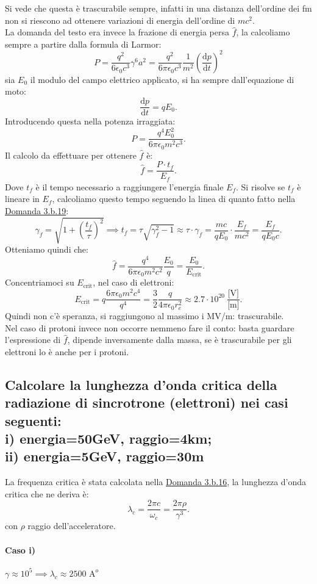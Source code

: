 Si vede che questa è trascurabile sempre, infatti in una distanza dell'ordine dei fm non si riescono ad ottenere variazioni di energia dell'ordine di  $mc^2$.\\
La domanda del testo era invece la frazione di energia persa $\hat{f}$, la calcoliamo sempre a partire dalla formula di Larmor:
\[
	P= \frac{q^2}{6\epsilon_0c^3}\gamma^6 a^2= 
	 \frac{q^2}{6\pi\epsilon_0c^3}\frac{1}{m^2}\left( \frac{\mbox{d} p}{\mbox{d} t}  \right)^2 
\]
sia $E_0$ il modulo del campo elettrico applicato,  si ha sempre dall'equazione di moto:
\[
	\frac{\mbox{d} p}{\mbox{d} t} = qE_0
.\] 
Introducendo questa nella potenza irraggiata:
\[
	P= \frac{q^4E^2_0}{6\pi\epsilon_0m^2c^3}
.\] 
Il calcolo da effettuare per ottenere $\hat{f}$ è:
\[
	\hat{f}= \frac{P\cdot t_f}{E_f}
.\] 
Dove $t_f$ è il tempo necessario a raggiungere l'energia finale $E_f$. Si risolve se $t_f$ è lineare in $E_f $, calcoliamo questo tempo seguendo la linea di quanto fatto nella \hyperref[sec:3.b.19]{Domanda 3.b.19}:
\[
	\gamma_f=\sqrt{1+\left( \frac{t_f}{\tau} \right)^2 } \implies t_f =
	\tau\sqrt{\gamma^2_f-1} \approx \tau \cdot \gamma_f = \frac{mc}{qE_0}\cdot \frac{E_f}{mc^2}= \frac{E_f}{qE_0 c}
.\] 
Otteniamo quindi che:
\[
	\hat{f} = \frac{q^4}{6\pi \epsilon_0m^2c^2}\frac{E_0}{q}=\frac{E_0}{E_{\text{crit}}}
.\] 
Concentriamoci su $E_{\text{crit}}$, nel caso di elettroni:
\[
	E_{\text{crit}}=q \frac{6\pi\epsilon_0m^2c^4}{q^4}= \frac{3}{2}\frac{q}{4\pi\epsilon_0 r_e^2} \approx 2.7 \cdot 10^{20} \ \frac{\text{[V]}}{\text{[m]}}
.\] 
Quindi non c'è speranza, si raggiungono al massimo i MV/m: trascurabile.\\
Nel caso di protoni invece non occorre nemmeno fare il conto: basta guardare l'espressione di $\hat{f}$, dipende inversamente dalla massa, se è trascurabile per gli elettroni lo è anche per i protoni.


\subsection[]{Calcolare la lunghezza d’onda critica della radiazione di sincrotrone (elettroni) nei casi seguenti: \\
i) energia=50GeV, raggio=4km; \\
ii) energia=5GeV, raggio=30m}
\label{sec:3.b.24}
La frequenza critica è stata calcolata nella \hyperref[sec:3.b.16]{Domanda 3.b.16}, la lunghezza d'onda critica che ne deriva è:
\[
	\lambda_c = \frac{2\pi c}{\omega_c} = \frac{2\pi\rho}{\gamma^3} 
.\] 
con $\rho$ raggio dell'acceleratore.
\paragraph{Caso i)}    $\gamma\approx 10^5 \implies \lambda_{c}\approx 2500 \text{ A}^o$
